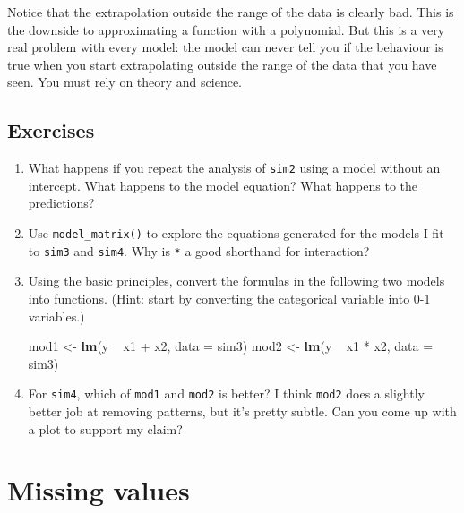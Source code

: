 \documentclass[]{book}
\newenvironment{Shaded}{\begin{snugshade}}{\end{snugshade}}
\newcommand{\KeywordTok}[1]{\textcolor[rgb]{0.13,0.29,0.53}{\textbf{{#1}}}}
\newcommand{\DataTypeTok}[1]{\textcolor[rgb]{0.13,0.29,0.53}{{#1}}}
\newcommand{\StringTok}[1]{\textcolor[rgb]{0.31,0.60,0.02}{{#1}}}
\newcommand{\NormalTok}[1]{{#1}}
\begin{document}
Notice that the extrapolation outside the range of the data is clearly
bad. This is the downside to approximating a function with a polynomial.
But this is a very real problem with every model: the model can never
tell you if the behaviour is true when you start extrapolating outside
the range of the data that you have seen. You must rely on theory and
science.

\subsection{Exercises}\label{exercises-62}

\begin{enumerate}
\def\labelenumi{\arabic{enumi}.}
\item
  What happens if you repeat the analysis of \texttt{sim2} using a model
  without an intercept. What happens to the model equation? What happens
  to the predictions?
\item
  Use \texttt{model\_matrix()} to explore the equations generated for
  the models I fit to \texttt{sim3} and \texttt{sim4}. Why is \texttt{*}
  a good shorthand for interaction?
\item
  Using the basic principles, convert the formulas in the following two
  models into functions. (Hint: start by converting the categorical
  variable into 0-1 variables.)

\begin{Shaded}
\begin{Highlighting}[]
\NormalTok{mod1 <-}\StringTok{ }\KeywordTok{lm}\NormalTok{(y ~}\StringTok{ }\NormalTok{x1 +}\StringTok{ }\NormalTok{x2, }\DataTypeTok{data =} \NormalTok{sim3)}
\NormalTok{mod2 <-}\StringTok{ }\KeywordTok{lm}\NormalTok{(y ~}\StringTok{ }\NormalTok{x1 *}\StringTok{ }\NormalTok{x2, }\DataTypeTok{data =} \NormalTok{sim3)}
\end{Highlighting}
\end{Shaded}
\item
  For \texttt{sim4}, which of \texttt{mod1} and \texttt{mod2} is better?
  I think \texttt{mod2} does a slightly better job at removing patterns,
  but it's pretty subtle. Can you come up with a plot to support my
  claim?
\end{enumerate}

\section{Missing values}\label{missing-values-5}
\end{document}
